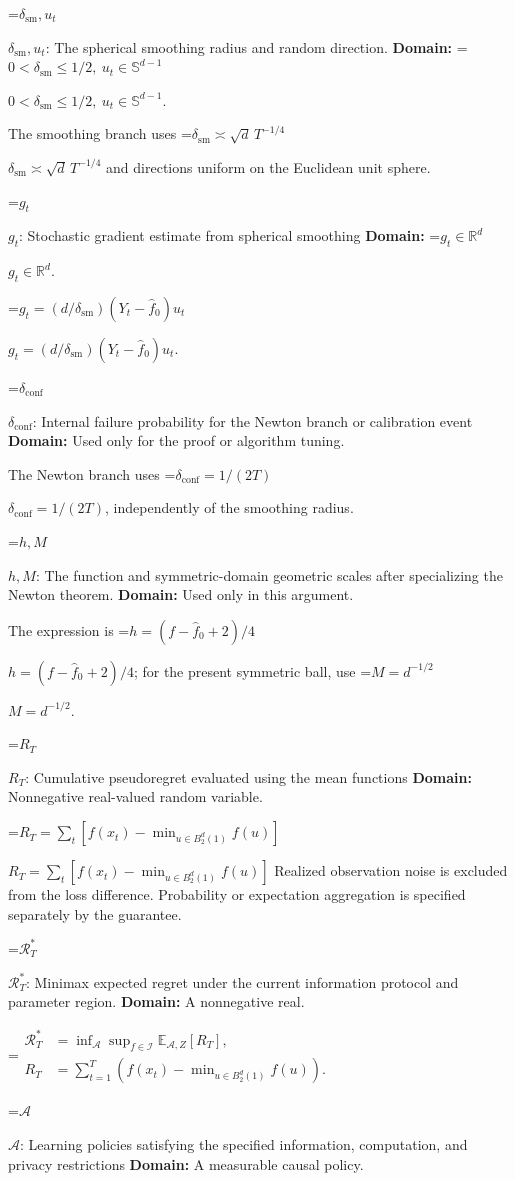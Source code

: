 \documentclass[10pt,a4paper]{article}
\newcommand{\AtlasMath}[1]{\par\begingroup\centering\setbox0=\hbox{$\displaystyle #1$}\ifdim\wd0>1.4\linewidth\typeout{ATLAS WIDE FORMULA: \the\wd0}\fi\ifdim\wd0>\linewidth\resizebox{\linewidth}{!}{\box0}\else\box0\fi\par\endgroup}
\newcommand{\AtlasInlineMath}[1]{\begingroup\setbox0=\hbox{$#1$}\ifdim\wd0>.4\linewidth\endgroup\AtlasMath{#1}\else\endgroup$#1$\fi}
\begin{document}
\AtlasInlineMath{\delta_{\mathrm{sm}},u_t}: The spherical smoothing radius and random direction. \textbf{Domain:} \AtlasInlineMath{0<\delta_{\mathrm{sm}}\le1/2,\ u_t\in\mathbb S^{d-1}}.

The smoothing branch uses \AtlasInlineMath{\delta_{\mathrm{sm}}\asymp\sqrt d\,T^{-1/4}} and directions uniform on the Euclidean unit sphere.

\AtlasInlineMath{g_t}: Stochastic gradient estimate from spherical smoothing \textbf{Domain:} \AtlasInlineMath{g_t\in\mathbb R^d}.

\AtlasInlineMath{g_t=(d/\delta_{\mathrm{sm}})(Y_t-\widehat f_0)u_t}.

\AtlasInlineMath{\delta_{\mathrm{conf}}}: Internal failure probability for the Newton branch or calibration event \textbf{Domain:} Used only for the proof or algorithm tuning.

The Newton branch uses \AtlasInlineMath{\delta_{\mathrm{conf}}=1/(2T)}, independently of the smoothing radius.

\AtlasInlineMath{h,M}: The function and symmetric-domain geometric scales after specializing the Newton theorem. \textbf{Domain:} Used only in this argument.

The expression is \AtlasInlineMath{h=(f-\widehat f_0+2)/4}; for the present symmetric ball, use \AtlasInlineMath{M=d^{-1/2}}.

\AtlasInlineMath{R_T}: Cumulative pseudoregret evaluated using the mean functions \textbf{Domain:} Nonnegative real-valued random variable.

\AtlasInlineMath{R_T=\sum_t[f(x_t)-\min_{u\in B_2^d(1)}f(u)]} Realized observation noise is excluded from the loss difference. Probability or expectation aggregation is specified separately by the guarantee.

\AtlasInlineMath{\mathcal R_T^*}: Minimax expected regret under the current information protocol and parameter region. \textbf{Domain:} A nonnegative real.


\AtlasMath{\begin{aligned}\mathcal R_T^*&=\inf_{\mathcal A}\sup_{f\in\mathcal I}\mathbb E_{\mathcal A,Z}[R_T],\\ R_T&=\sum_{t=1}^T\left(f(x_t)-\min_{u\in B_2^d(1)}f(u)\right).\end{aligned}}


\AtlasInlineMath{\mathcal A}: Learning policies satisfying the specified information, computation, and privacy restrictions \textbf{Domain:} A measurable causal policy.
\end{document}
